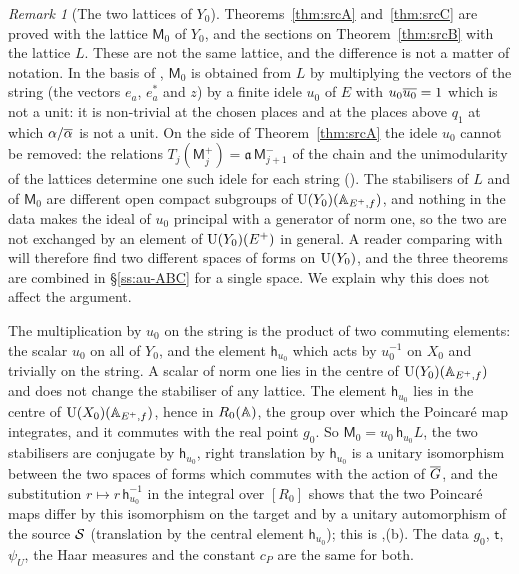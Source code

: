 \documentclass[10pt]{amsart}
\theoremstyle{definition}
\theoremstyle{remark}
\newtheorem{remark}[theorem]{Remark}
\begin{document}
\begin{remark}[The two lattices of $Y_0$]\label{au:two-lattices}
Theorems~\ref{thm:srcA} and~\ref{thm:srcC} are proved with the lattice $\mathsf M_0$ of $Y_0$, and the
sections on Theorem~\ref{thm:srcB} with the lattice $L$. These are not the same lattice, and the
difference is not a matter of notation. In the basis of {\cite[\S2.1]{P51}}, $\mathsf M_0$ is
obtained from $L$ by multiplying the vectors of the string (the vectors $e_a$, $e_a^*$ and $z$) by a
finite idele $u_0$ of $E$ with $u_0\overline{u_0}=1$ which is not a unit: it is non-trivial at the chosen
places and at the places above $q_1$ at which $\alpha/\overline{\alpha}$ is not a unit. On the side of
Theorem~\ref{thm:srcA} the idele $u_0$ cannot be removed: the relations
$T_j(\mathsf M_j^+)=\mathfrak a\,\mathsf M_{j+1}^-$ of the chain and the unimodularity of the lattices
determine one such idele for each string ({\cite[\S5.1.3]{P49}}). The stabilisers of $L$ and of
$\mathsf M_0$ are different open compact subgroups of $\mathrm U(Y_0)(\mathbb A_{E^+,f})$, and nothing in the
data makes the ideal of $u_0$ principal with a generator of norm one, so the two are not exchanged by
an element of $\mathrm U(Y_0)(E^+)$ in general. A reader comparing {\cite[\S5.1.3]{P49}} with
{\cite[\S2.1]{P51}} will therefore find two different spaces of forms on $\mathrm U(Y_0)$, and the three
theorems are combined in \S\ref{ss:au-ABC} for a single space. We explain why this does not affect
the argument.

The multiplication by $u_0$ on the string is the product of two commuting elements: the scalar
$u_0$ on all of $Y_0$, and the element $\mathsf h_{u_0}$ which acts by $u_0^{-1}$ on $X_0$ and trivially
on the string. A scalar of norm one lies in the centre of $\mathrm U(Y_0)(\mathbb A_{E^+,f})$ and does not change
the stabiliser of any lattice. The element $\mathsf h_{u_0}$ lies in the centre of
$\mathrm U(X_0)(\mathbb A_{E^+,f})$, hence in $R_0(\mathbb A)$, the group over which the Poincar\'e map integrates, and
it commutes with the real point $g_0$. So $\mathsf M_0=u_0\,\mathsf h_{u_0}L$, the two stabilisers are
conjugate by $\mathsf h_{u_0}$, right translation by $\mathsf h_{u_0}$ is a unitary isomorphism between
the two spaces of forms which commutes with the action of $\overline G$, and the substitution
$r\mapsto r\,\mathsf h_{u_0}^{-1}$ in the integral over $[R_0]$ shows that the two Poincar\'e maps differ
by this isomorphism on the target and by a unitary automorphism of the source $\mathcal S$ (translation by
the central element $\mathsf h_{u_0}$); this is {\cite[Lemma~2.14(a)]{P51}},(b). The data $g_0$,
$\mathsf t$, $\psi_U$, the Haar measures and the constant $c_P$ are the same for both.


\end{remark}
\end{document}
